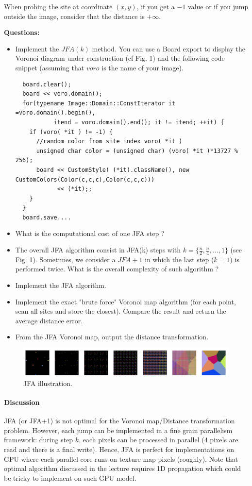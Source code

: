 \documentclass[a4paper, 11pt]{article}
\begin{document}
\noindent When probing the site at coordinate $(x,y)$, if you get a $-1$ value or if you jump outside the image, consider that the distance is $+\infty$.

\bigskip
{\bf Questions:}
\begin{itemize}
	\item Implement the $JFA(k)$ method. You can use a Board export to display the Voronoi diagram under construction (cf Fig. 1) and the following code snippet (assuming that $voro$ is the name of your image).
\begin{verbatim}
  board.clear();
  board << voro.domain();
  for(typename Image::Domain::ConstIterator it =voro.domain().begin(),
           itend = voro.domain().end(); it != itend; ++it) {
    if (voro( *it ) != -1) {
      //random color from site index voro( *it ) 
      unsigned char color = (unsigned char) (voro( *it )*13727 % 256);
      board << CustomStyle( (*it).className(), new CustomColors(Color(c,c,c),Color(c,c,c)))
            << (*it);;
    }
  }
  board.save....
\end{verbatim}
	\item What is the computational cost of one JFA step ?
	\item The overall JFA algorithm consist in JFA(k) steps with $k=\{\frac{n}{2}, \frac{n}{4}, \ldots, 1\}$ (see Fig. 1). Sometimes, we consider a $JFA+1$ in which the last step ($k=1$) is performed twice. What is the overall complexity of such algorithm ? 
	\item Implement the JFA algorithm.
	\item Implement the exact "brute force" Voronoi map algorithm (for each point, scan all sites and store the closest). Compare the result and return the average distance error.
	\item From the JFA Voronoi map, output the distance transformation.
\end{itemize}

\begin{figure}
  \centering  \includegraphics[width=15cm]{jfa}
  \caption{JFA illustration.}
\end{figure}


\paragraph{Discussion}
\par JFA (or JFA+1) is not optimal for the Voronoi map/Distance transformation problem. However, each jump can be implemented in a fine grain parallelism framework: during step $k$, each pixels can be processed in parallel (4 pixels are read and there is a final write). Hence, JFA is perfect for implementations on GPU where each
parallel core runs on texture map pixels (roughly). Note that optimal algorithm discussed in the lecture requires 1D propagation which could be tricky to implement on such GPU model.
\end{document}
